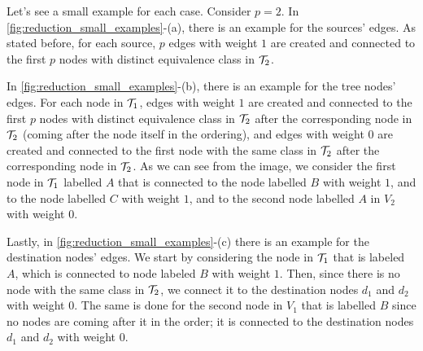 \begin{example}[Edges]
    Let's see a small example for each case. Consider $p=2$. In \cref{fig:reduction_small_examples}-(a), there is an example for the sources' edges. As stated before, for each source, $p$ edges with weight $1$ are created and connected to the first $p$ nodes with distinct equivalence class in $\mathcal{T}_{2}$.

    In \cref{fig:reduction_small_examples}-(b), there is an example for the tree nodes' edges. For each node in $\mathcal{T}_{1}$, edges with weight $1$ are created and connected to the first $p$ nodes with distinct equivalence class in $\mathcal{T}_{2}$ after the corresponding node in $\mathcal{T}_{2}$ (coming after the node itself in the ordering), and edges with weight $0$ are created and connected to the first node with the same class in $\mathcal{T}_{2}$ after the corresponding node in $\mathcal{T}_{2}$. As we can see from the image, we consider the first node in $\mathcal{T}_{1}$ labelled $A$ that is connected to the node labelled $B$ with weight $1$, and to the node labelled $C$ with weight $1$, and to the second node labelled $A$ in $V_2$ with weight $0$.

    Lastly, in \cref{fig:reduction_small_examples}-(c) there is an example for the destination nodes' edges. We start by considering the node in $\mathcal{T}_{1}$ that is labeled $A$, which is connected to node labeled $B$ with weight $1$. Then, since there is no node with the same class in $\mathcal{T}_{2}$, we connect it to the destination nodes $d_1$ and $d_2$ with weight $0$. The same is done for the second node in $V_1$ that is labelled $B$ since no nodes are coming after it in the order; it is connected to the destination nodes $d_1$ and $d_2$ with weight $0$.

    \begin{figure}[H]
        \centering
        \begin{subfigure}[b]{0.3\textwidth}
            \centering
\end{subfigure}
\end{figure}
\end{example}
